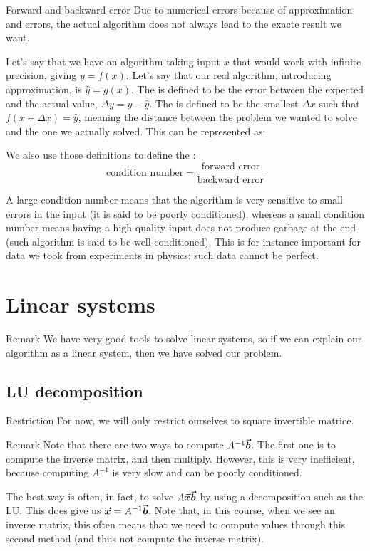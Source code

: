 \documentclass[a4paper]{article}
\begin{document}
\begin{parag}{Forward and backward error}
    Due to numerical errors because of approximation and errors, the actual algorithm does not always lead to the exacte result we want. 

    Let's say that we have an algorithm taking input $x$ that would work with infinite precision, giving $y = f\left(x\right)$. Let's say that our real algorithm, introducing approximation, is $\hat{y} = g\left(x\right)$. The  is defined to be the error between the expected and the actual value, $\Delta y = y - \hat{y}$. The  is defined to be the smallest $\Delta x$ such that $f\left(x + \Delta x\right) = \hat{y}$, meaning the distance between the problem we wanted to solve and the one we actually solved. This can be represented as:

    We also use those definitions to define the :
    \[\text{condition number} = \frac{\text{forward error}}{\text{backward error}}\]

    A large condition number means that the algorithm is very sensitive to small errors in the input (it is said to be poorly conditioned), whereas a small condition number means having a high quality input does not produce garbage at the end (such algorithm is said to be well-conditioned). This is for instance important for data we took from experiments in physics: such data cannot be perfect.
\end{parag}



\section{Linear systems}
\begin{parag}{Remark}
    We have very good tools to solve linear systems, so if we can explain our algorithm as a linear system, then we have solved our problem.
\end{parag}

\subsection{LU decomposition}
\begin{parag}{Restriction}
    For now, we will only restrict ourselves to square invertible matrice.
\end{parag}

\begin{parag}{Remark}
    Note that there are two ways to compute $A^{-1} \bm{\protect\vec{b}}$. The first one is to compute the inverse matrix, and then multiply. However, this is very inefficient, because computing $A^{-1}$ is very slow and can be poorly conditioned.

    The best way is often, in fact, to solve $A \bm{\protect\vec{x}} \bm{\protect\vec{b}}$ by using a decomposition such as the LU. This does give us $\bm{\protect\vec{x}} = A^{-1} \bm{\protect\vec{b}}$. Note that, in this course, when we see an inverse matrix, this often means that we need to compute values through this second method (and thus not compute the inverse matrix).
\end{parag}
\end{document}
